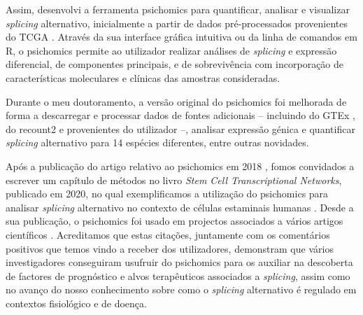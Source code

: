Assim, desenvolvi a ferramenta psichomics para quantificar, analisar e visualizar \emph{splicing} alternativo, inicialmente a partir de dados pré-processados provenientes do TCGA \cite{chang:2013ww}. Através da sua interface gráfica intuitiva ou da linha de comandos em R, o psichomics permite ao utilizador realizar análises de \emph{splicing} e expressão diferencial, de componentes principais, e de sobrevivência com incorporação de características moleculares e clínicas das amostras consideradas.

Durante o meu doutoramento, a versão original do psichomics foi melhorada de forma a descarregar e processar dados de fontes adicionais -- incluindo do GTEx \cite{lonsdale:2013uo}, do recount2 \cite{collado-torres:2017uw} e provenientes do utilizador --, analisar expressão génica e quantificar \emph{splicing} alternativo para 14 espécies diferentes, entre outras novidades.


Após a publicação do artigo relativo ao psichomics em 2018 \cite{saraiva-agostinho:2018uq}, fomos convidados a escrever um capítulo de métodos no livro \emph{Stem Cell Transcriptional Networks}, publicado em 2020, no qual exemplificamos a utilização do psichomics para analisar \emph{splicing} alternativo no contexto de células estaminais humanas \cite{saraiva-agostinho:2020wz}. Desde a sua publicação, o psichomics foi usado em projectos associados a vários artigos científicos \cite{coomer:2019wz,baeza-centurion:2019tb,munkley:2019wr,baeza-centurion:2020vb}. Acreditamos que estas citações, juntamente com os comentários positivos que temos vindo a receber dos utilizadores, demonstram que vários investigadores conseguiram usufruir do psichomics para os auxiliar na descoberta de factores de prognóstico e alvos terapêuticos associados a \emph{splicing}, assim como no avanço do nosso conhecimento sobre como o \emph{splicing} alternativo é regulado em contextos fisiológico e de doença.

